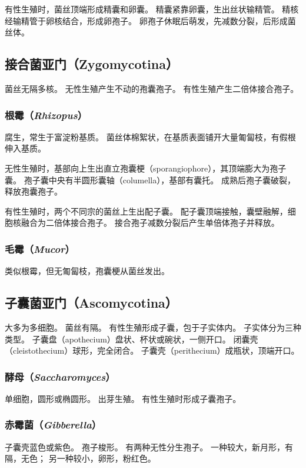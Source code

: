 \documentclass[11pt]{article}
\begin{document}
\newline

有性生殖时，菌丝顶端形成精囊和卵囊。
精囊紧靠卵囊，生出丝状输精管。
精核经输精管于卵核结合，形成卵孢子。
卵孢子休眠后萌发，先减数分裂，后形成菌丝体。

\subsection{接合菌亚门（Zygomycotina）}
菌丝无隔多核。
无性生殖产生不动的孢囊孢子。
有性生殖产生二倍体接合孢子。

\subsubsection{根霉（\textit{Rhizopus}）}
腐生，常生于富淀粉基质。
菌丝体棉絮状，在基质表面铺开大量匍匐枝，有假根伸入基质。

\newline

无性生殖时，基部向上生出直立孢囊梗（sporangiophore），其顶端膨大为孢子囊。
孢子囊中央有半圆形囊轴（columella），基部有囊托。
成熟后孢子囊破裂，释放孢囊孢子。

\newline

有性生殖时，两个不同宗的菌丝上生出配子囊。
配子囊顶端接触，囊壁融解，细胞核融合为二倍体接合孢子。
接合孢子减数分裂后产生单倍体孢子并释放。

\subsubsection{毛霉（\textit{Mucor}）}
类似根霉，但无匍匐枝，孢囊梗从菌丝发出。

\subsection{子囊菌亚门（Ascomycotina）}
大多为多细胞。
菌丝有隔。
有性生殖形成子囊，包于子实体内。
子实体分为三种类型。
子囊盘（apothecium）盘状、杯状或碗状，一侧开口。
闭囊壳（cleistothecium）球形，完全闭合。
子囊壳（perithecium）成瓶状，顶端开口。

\subsubsection{酵母（\textit{Saccharomyces}）}
单细胞，圆形或椭圆形。
出芽生殖。
有性生殖时形成子囊孢子。

\subsubsection{赤霉菌（\textit{Gibberella}）}
子囊壳蓝色或紫色。
孢子梭形。
有两种无性分生孢子。
一种较大，新月形，有隔，无色；
另一种较小，卵形，粉红色。
\end{document}
